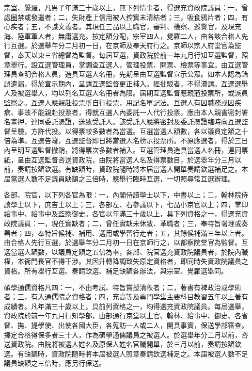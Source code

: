 \begin{pinyinscope}
宗室、覺羅，凡男子年滿三十歲以上，無下列情事者，得選充資政院議員：一，曾處圈禁或發遣者；二，失財產上信用被人控實未清結者；三，吸食鴉片者；四，有心疾者；五，不識文義者。其現任三品以上職官，審判、檢察、巡警官，及現充海、陸軍軍人者，無庸選充。按定額分配，宗室四人，覺羅二人，由各該合格人先行互選。於選舉年分二月初一日，在京師及奉天府行之。京師以宗人府堂官為監督，奉天以東三省總督為監督。每屆互選，資政院於前一年九月行知互選監督，照章舉行。設互選管理員，掌調查互選人，管理投票、開票、檢票等事宜。由互選管理員查明合格人員，造具互選人名冊，先期呈由互選監督宣示公眾。如本人認為錯誤遺漏，得於宣示期內，呈請互選監督更正補入。經批駁者，不得瀆請。互選選舉人及被選舉人，均以列名互選人名冊者為限。屆期互選監督應親蒞投票所，或派員監察之。互選人應親赴投票所自行投票，用記名單記法。互選人有因職務或因疾病、事故不能親赴投票者，得就互選人內委託一人代行投票，應由本人親書密封署名畫押，連同委託憑證，送致受託人。該受託人應將密封及委託憑證臨時向互選監督呈驗，方許代投。以得票較多數者為當選。互選當選人額數，各以議員定額之十倍為準。互選告竣，互選監督即日將當選人名榜示投票所。不原應選者，得於三日內呈明互選監督撤銷，將得票次多數者補入。互選管理員造具當選人名冊，連同票紙，呈由互選監督咨送資政院，由院將當選人名及得票數目，於選舉年分三月以前，奏請按額欽選。有缺額時，資政院隨時將本屆當選人開單奏請欽選補足之。本屆當選人數不足議員缺額之三倍時，應舉行臨時互選，一切照尋常互選辦理。

各部、院官，以下列各官為限：一，內閣侍讀學士以下，中書以上；二，翰林院侍讀學士以下，庶吉士以上；三，各部左、右參議以下，七品小京官以上；四，掌印給事中、給事中及監察御史。各官以年滿三十歲以上，具下列資格之一，得選充資政院議員：一，現任實缺者；二，曾任實缺未休致、革職者；三，奉特旨署理或奏署者；四，奉特旨候補、補用、選用或學習行走者；五，其餘候補滿三年以上者。由合格人先行互選，於選舉年分二月初一日在京師行之，以都察院堂官為監督。互選當選人額數，以議員定額之五倍為率，各部、院官選充資政院議員者，於院內職權，本衙門長官不得干涉。其因升轉降調致失原定資格者，即同時失資政院議員之資格。所有舉行互選、奏請欽選、補足缺額各辦法，與宗室、覺羅選舉同。

碩學通儒資格凡四：一，不由考試、特旨賞授清秩者；二，著書有裨政治或學術者；三，有入通儒院之資格者；四，充高等及專門學堂主要科目教習五年以上著有成績者。凡年滿三十歲以上，具前列資格之一，均得選充資政院議員。每屆選舉，資政院於前一年九月行知學部，由部通行京堂以上官、翰林、給事中、御史、各省督、撫、提學使、出使各國大臣，各蒐訪一人或二人，開具事實，保送學部審查。擇定合格得保多者三十人，作為碩學通儒議員之被選人。於選舉年分二月以前，咨送資政院。由院將被選人姓名及原保人姓名官職開單，於三月以前，奏請按額欽選。有缺額時，資政院隨時將本屆被選人照章奏請欽選補足之。本屆被選人數不足議員缺額之三倍時，應另行保送。


\end{pinyinscope}
